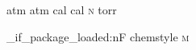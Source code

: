 %
%
%
%
%

\RequirePackage{siunitx}

\DeclareSIUnit {\atm       } {atm}
\DeclareSIUnit {\atmosphere} {atm}
\DeclareSIUnit {\calory    } {cal}
\DeclareSIUnit {\cal       } {cal}
\DeclareSIUnit {\moLar     } {\mole\per\liter}
\DeclareSIUnit {\MolMass   } {\gram\per\mole}
\DeclareSIUnit {\normal    } {\textsc{n}}
\DeclareSIUnit {\torr      } {torr}

\AtBeginDocument
  {
    \chemmacros_if_package_loaded:nF {chemstyle}
      {
        \DeclareSIUnit {\cmc  } {\cubic\centi\metre}
        \DeclareSIUnit {\molar} {\mole\per\cubic\deci\metre}
        \DeclareSIUnit {\Molar} {\textsc{m}}
      }
  }

